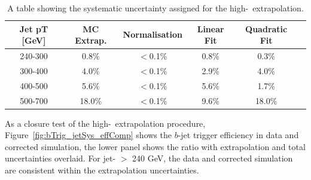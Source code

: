 \begin{table}[!ht]
  \begin{center}
\begin{tabular}{|c||c||c|c|c|c|}
  \hline
  Jet pT [GeV] & MC Extrap. & Normalisation & Linear Fit  & Quadratic Fit \\
  \hline
  240-300 &  0.8\% & $<$0.1\% & 0.8\% &  0.3\% \\
  300-400 &  4.0\% & $<$0.1\% & 2.9\% &  4.0\% \\
  400-500 &  5.6\% & $<$0.1\% & 5.6\% &  1.7\% \\
  500-700 & 18.0\% & $<$0.1\% & 9.6\% & 18.0\% \\
  \hline
\end{tabular}
\caption{A table showing the systematic uncertainty assigned for the high-\pT~extrapolation.}
\label{tab:bTrig_extrapSyst}
\vspace{-1em}
  \end{center}
\end{table}

As a closure test of the high-\pT~extrapolation procedure,
Figure~\ref{fig:bTrig_jetSys_effComp} shows the $b$-jet trigger efficiency in data and corrected simulation,
the lower panel shows the ratio with extrapolation and total uncertainties overlaid.
For jet-\pT{} $>$ 240 GeV, the data and corrected simulation are consistent within the extrapolation uncertainties.


